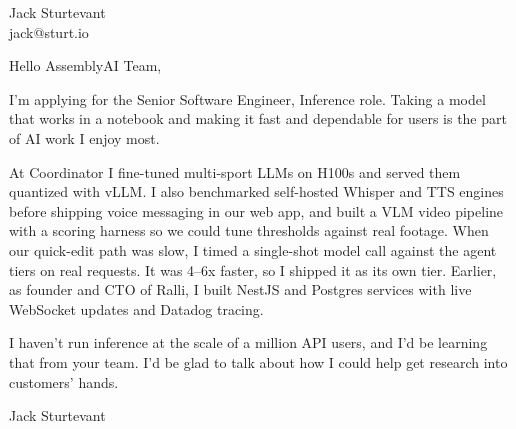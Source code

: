 \documentclass[11pt]{article}
\begin{document}
\raggedright

{\namefont\fontsize{20pt}{24pt}\selectfont Jack Sturtevant}\\[-0.3em]
jack@sturt.io

\vspace{1.2em}

Hello AssemblyAI Team,

I'm applying for the Senior Software Engineer, Inference role. Taking a model that works in a notebook and making it fast and dependable for users is the part of AI work I enjoy most.

At Coordinator I fine-tuned multi-sport LLMs on H100s and served them quantized with vLLM. I also benchmarked self-hosted Whisper and TTS engines before shipping voice messaging in our web app, and built a VLM video pipeline with a scoring harness so we could tune thresholds against real footage. When our quick-edit path was slow, I timed a single-shot model call against the agent tiers on real requests. It was 4--6x faster, so I shipped it as its own tier. Earlier, as founder and CTO of Ralli, I built NestJS and Postgres services with live WebSocket updates and Datadog tracing.

I haven't run inference at the scale of a million API users, and I'd be learning that from your team. I'd be glad to talk about how I could help get research into customers' hands.

\vspace{0.6em}
Jack Sturtevant
\end{document}
